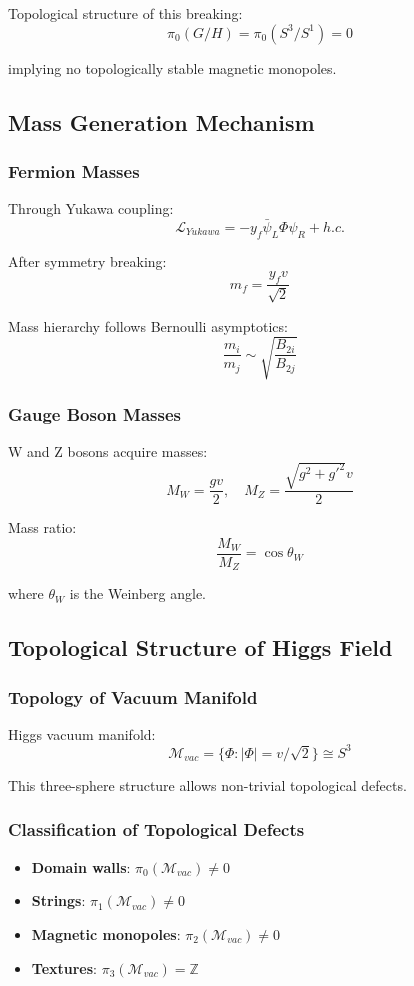 \documentclass[11pt]{article}
\begin{document}
Topological structure of this breaking:
$$\pi_0(G/H) = \pi_0(S^3/S^1) = 0$$

implying no topologically stable magnetic monopoles.

\subsection{Mass Generation Mechanism}

\subsubsection{Fermion Masses}

Through Yukawa coupling:
$$\mathcal{L}_{Yukawa} = -y_f \bar{\psi}_L \Phi \psi_R + h.c.$$

After symmetry breaking:
$$m_f = \frac{y_f v}{\sqrt{2}}$$

Mass hierarchy follows Bernoulli asymptotics:
$$\frac{m_i}{m_j} \sim \sqrt{\frac{B_{2i}}{B_{2j}}}$$

\subsubsection{Gauge Boson Masses}

W and Z bosons acquire masses:
$$M_W = \frac{g v}{2}, \quad M_Z = \frac{\sqrt{g^2 + g'^2} v}{2}$$

Mass ratio:
$$\frac{M_W}{M_Z} = \cos \theta_W$$

where $\theta_W$ is the Weinberg angle.

\subsection{Topological Structure of Higgs Field}

\subsubsection{Topology of Vacuum Manifold}

Higgs vacuum manifold:
$$\mathcal{M}_{vac} = \{\Phi : |\Phi| = v/\sqrt{2}\} \cong S^3$$

This three-sphere structure allows non-trivial topological defects.

\subsubsection{Classification of Topological Defects}

\begin{itemize}
\item \textbf{Domain walls}: $\pi_0(\mathcal{M}_{vac}) \neq 0$
\item \textbf{Strings}: $\pi_1(\mathcal{M}_{vac}) \neq 0$
\item \textbf{Magnetic monopoles}: $\pi_2(\mathcal{M}_{vac}) \neq 0$
\item \textbf{Textures}: $\pi_3(\mathcal{M}_{vac}) = \mathbb{Z}$
\end{itemize}
\end{document}
